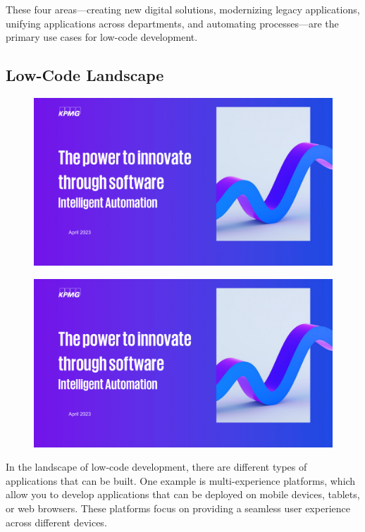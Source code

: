 These four areas---creating new digital solutions, modernizing legacy
applications, unifying applications across departments, and automating
processes---are the primary use cases for low-code development.

\subsection{Low-Code Landscape}\label{low-code-landscape}

\begin{figure}[!h]
    \centering
    \includegraphics[page=14, trim = 2cm 2cm 2cm 0cm, clip, width=\textwidth]{images/02 - KPMG_intelligent_automation_2.pdf}
\end{figure}

\begin{figure}[!h]
    \centering
    \includegraphics[page=15, trim = 2cm 2cm 2cm 0cm, clip, width=\textwidth]{images/02 - KPMG_intelligent_automation_2.pdf}
\end{figure}

In the landscape of low-code development, there are different types of
applications that can be built. One example is multi-experience
platforms, which allow you to develop applications that can be deployed
on mobile devices, tablets, or web browsers. These platforms focus on
providing a seamless user experience across different devices.

